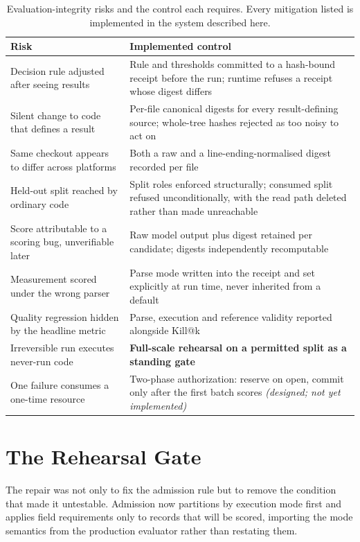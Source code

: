 \documentclass[10pt,conference]{IEEEtran}
\makeatletter
\newcommand{\killk}[1]{Kill@#1}
\makeatother
\begin{document}
\begin{table}[t]
\caption{Evaluation-integrity risks and the control each requires. Every
mitigation listed is implemented in the system described here.}
\label{tab:risk}
\centering
\scriptsize
\begin{tabular}{@{}p{}p{}@{}}
\toprule
\textbf{Risk} & \textbf{Implemented control} \\
\midrule
Decision rule adjusted after seeing results & Rule and thresholds committed to a
hash-bound receipt before the run; runtime refuses a receipt whose digest
differs \\
Silent change to code that defines a result & Per-file canonical digests for
every result-defining source; whole-tree hashes rejected as too noisy to act on \\
Same checkout appears to differ across platforms & Both a raw and a
line-ending-normalised digest recorded per file \\
Held-out split reached by ordinary code & Split roles enforced structurally;
consumed split refused unconditionally, with the read path deleted rather than
made unreachable \\
Score attributable to a scoring bug, unverifiable later & Raw model output plus
digest retained per candidate; digests independently recomputable \\
Measurement scored under the wrong parser & Parse mode written into the receipt
and set explicitly at run time, never inherited from a default \\
Quality regression hidden by the headline metric & Parse, execution and
reference validity reported alongside \killk{k} \\
Irreversible run executes never-run code & \textbf{Full-scale rehearsal on a
permitted split as a standing gate} \\
One failure consumes a one-time resource & Two-phase authorization: reserve on
open, commit only after the first batch scores \textit{(designed; not yet
implemented)} \\
\bottomrule
\end{tabular}
\end{table}

\section{The Rehearsal Gate}

The repair was not only to fix the admission rule but to remove the condition
that made it untestable. Admission now partitions by execution mode first and
applies field requirements only to records that will be scored, importing the
mode semantics from the production evaluator rather than restating them.
\end{document}
